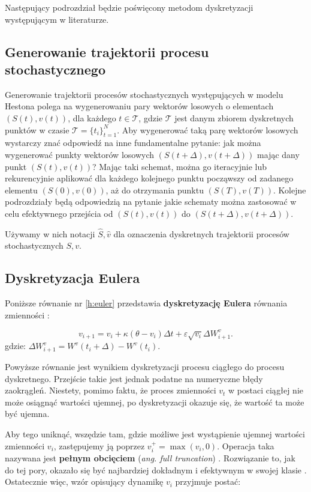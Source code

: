 \documentclass{pracamgr}
\begin{document}
Następujący podrozdział będzie poświęcony metodom dyskretyzacji występującym w literaturze.

\subsection{Generowanie trajektorii procesu stochastycznego}
Generowanie trajektorii procesów stochastycznych występujących w modelu Hestona polega na
wygenerowaniu pary wektorów losowych o elementach $(S(t), v(t))$, dla każdego $t \in \mathscr{T}$, 
gdzie $\mathscr{T}$ jest danym zbiorem dyskretnych punktów w czasie 
$\mathscr{T}  = \{t_i\}^N_{t=1}$. Aby wygenerować taką parę wektorów losowych wystarczy znać 
odpowiedź na inne fundamentalne pytanie: jak można wygenerować punkty wektorów losowych 
$(S(t+ \Delta), v(t+ \Delta))$
mając dany punkt $(S(t), v(t))$? Mając taki schemat, można go iteracyjnie lub rekurencyjnie aplikować 
dla każdego kolejnego punktu począwszy od zadanego elementu $(S(0), v(0))$, 
aż do otrzymania punktu $(S(T), v(T))$.
Kolejne podrozdziały będą odpowiedzią na pytanie jakie schematy można zastosować w celu 
efektywnego przejścia od $(S(t), v(t))$ do $(S(t+ \Delta), v(t+ \Delta))$.

Używamy w nich notacji $\hat{S}, \hat{v}$ dla oznaczenia dyskretnych trajektorii procesów 
stochastycznych $S, v$.

\subsection{Dyskretyzacja Eulera}

Poniższe równanie nr \ref{h:euler} przedstawia \textbf{dyskretyzację Eulera} równania 
zmienności \cite{Broadie}:
 
\begin{equation}\label{h:euler}
v_{i+1}  = v_i + \kappa (\theta - v_i) \Delta t + \varepsilon  \sqrt{v_i} \Delta W^{v}_{i+1}.
\end{equation}
gdzie: $\Delta W^{v}_{i+1} = W^{v} (t_i+\Delta) - W^{v} (t_i)$.

Powyższe równanie jest wynikiem dyskretyzacji procesu ciągłego do procesu dyskretnego. Przejście
takie jest jednak podatne na numeryczne błędy zaokrągleń. Niestety, pomimo faktu, że 
proces zmienności $v_t$ w postaci ciągłej nie może osiągnąć wartości ujemnej, po 
dyskretyzacji okazuje się, że wartość ta może być ujemna. 

Aby tego uniknąć, wszędzie tam, gdzie możliwe jest wystąpienie ujemnej 
wartości zmienności $v_i$, zastępujemy ją poprzez $v_i^+ = \max(v_i, 0)$. Operacja taka nazywana jest 
\textbf{pełnym obcięciem} (\textit{ang. full truncation}) \cite{Lord}.
Rozwiązanie to, jak do tej pory, okazało się być najbardziej dokładnym i 
efektywnym w swojej klasie \cite{Malham}. Ostatecznie więc, wzór opisujący dynamikę $v_i$ przyjmuje 
postać:
\end{document}
